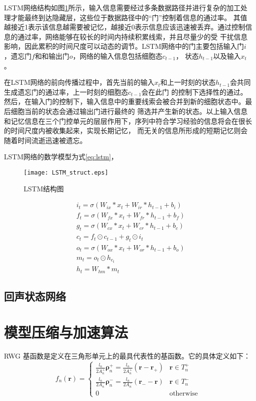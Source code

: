 LSTM网络结构如图\ref{fig:lstm}所示，输入信息需要经过多条数据路径并进行复杂的加工处理才能最终到达隐藏层，这些位于数据路径中的“门”控制着信息的通过率。
其值越接近1表示该信息越需要被记忆，越接近0表示信息应该迅速被丢弃。通过控制信息的通过率，网络能够在较长的时间内持续积累线索，并且尽量少的受
干扰信息影响，因此累积的时间尺度可以动态的调节。LSTM网络中的门主要包括输入门\(i\)，遗忘门\(f\)和和输出门\(o\)，网络的输入信息包括细胞态\(c_{t-1}\)，
状态\(h_{t-1}\)以及输入\(x_t\)。

在LSTM网络的前向传播过程中，首先当前的输入\(x_t\)和上一时刻的状态\(h_{t-1}\)会共同生成遗忘门的通过率，上一时刻的细胞态\(c_{t-1}\)会在此门
的控制下选择性的通过。然后，在输入门的控制下，输入信息中的重要线索会被合并到新的细胞状态中。最后细胞当前的状态会通过输出门进行最终的
筛选并产生新的状态。以上输入信息和记忆信息在三个门控单元的层层作用下，序列中符合学习经验的信息将会在很长的时间尺度内被收集起来，实现长期记忆，
而无关的信息所形成的短期记忆则会随着时间流逝迅速被遗忘。

LSTM网络的数学模型为式\ref{eq:lstm}，


\begin{figure}
	\centering
	\texttt{[image: LSTM\_struct.eps]}
	\caption{LSTM结构图}
	\label{fig:lstm}
\end{figure}


\begin{equation}\label{eq:lstm}
	\begin{split}
		&i_t = \sigma(W_{ix}*x_t + W_{ir}*h_{t-1} + b_i)	\\
		&f_t = \sigma(W_{fx}*x_t + W_{fr}*h_{t-1} + b_f)	\\
		&g_t = \sigma(W_{cx}*x_t + W_{cr}*h_{t-1} + b_c)					\\
		&c_t = f_t \odot c_{t-1} + g_t \odot i_t							\\	
		&o_t = \sigma(W_{ox}*x_{t} + W_{or} * h_{t-1} + b_o)	\\
		&m_t = o_t \odot h_{c_t}											\\
		&h_t = W_{hm}*m_t													
	\end{split}
\end{equation}


\subsection{回声状态网络} 

\section{模型压缩与加速算法}
RWG 基函数是定义在三角形单元上的最具代表性的基函数。它的具体定义如下：
\begin{equation}
f_n(\bm{r})=
\begin{cases}
\frac{l_n}{2A_n^+}\bm{\rho}_n^+=\frac{l_n}{2A_n^+}(\bm{r}-\bm{r}_+)&\bm{r}\in T_n^+\\
\frac{l_n}{2A_n^-}\bm{\rho}_n^-=\frac{l_n}{2A_n^-}(\bm{r}_--\bm{r})&\bm{r}\in T_n^-\\
0&\text{otherwise}
\end{cases}
\end{equation}

